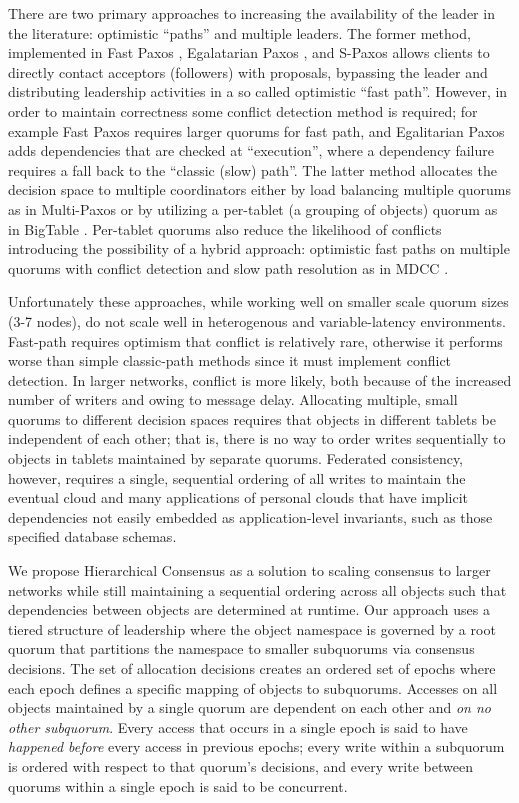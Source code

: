 \documentclass{article}
\begin{document}
There are two primary approaches to increasing the availability of the leader in the literature: optimistic ``paths'' and multiple leaders. The former method, implemented in Fast Paxos \cite{lamport_fast_2006}, Egalatarian Paxos \cite{moraru_egalitarian_2012}, and S-Paxos \cite{biely_s-paxos:_2012} allows clients to directly contact acceptors (followers) with proposals, bypassing the leader and distributing leadership activities in a so called optimistic ``fast path''. However, in order to maintain correctness some conflict detection method is required; for example Fast Paxos requires larger quorums for fast path, and Egalitarian Paxos adds dependencies that are checked at ``execution'', where a dependency failure requires a fall back to the ``classic (slow) path''. The latter method allocates the decision space to multiple coordinators either by load balancing multiple quorums as in Multi-Paxos \cite{camargos_multicoordinated_2007} or by utilizing a per-tablet (a grouping of objects) quorum as in BigTable \cite{chang_bigtable:_2008}. Per-tablet quorums also reduce the likelihood of conflicts introducing the possibility of a hybrid approach: optimistic fast paths on multiple quorums with conflict detection and slow path resolution as in MDCC \cite{kraska_mdcc:_2013}.

Unfortunately these approaches, while working well on smaller scale quorum sizes (3-7 nodes), do not scale well in heterogenous and variable-latency environments. Fast-path requires optimism that conflict is relatively rare, otherwise it performs worse than simple classic-path methods since it must implement conflict detection. In larger networks, conflict is more likely, both because of the increased number of writers and owing to message delay. Allocating multiple, small quorums to different decision spaces requires that objects in different tablets be independent of each other; that is, there is no way to order writes sequentially to objects in tablets maintained by separate quorums. Federated consistency, however, requires a single, sequential ordering of all writes to maintain the eventual cloud and many applications of personal clouds that have implicit dependencies not easily embedded as application-level invariants, such as those specified database schemas.

We propose Hierarchical Consensus as a solution to scaling consensus to larger networks while still maintaining a sequential ordering across all objects such that dependencies between objects are determined at runtime. Our approach uses a tiered structure of leadership where the object namespace is governed by a root quorum that partitions the namespace to smaller subquorums via consensus decisions. The set of allocation decisions creates an ordered set of epochs where each epoch defines a specific mapping of objects to subquorums. Accesses on all objects maintained by a single quorum are dependent on each other and \textit{on no other subquorum}. Every access that occurs in a single epoch is said to have \textit{happened before} every access in previous epochs; every write within a subquorum is ordered with respect to that quorum's decisions, and every write between quorums within a single epoch is said to be concurrent.
\end{document}
